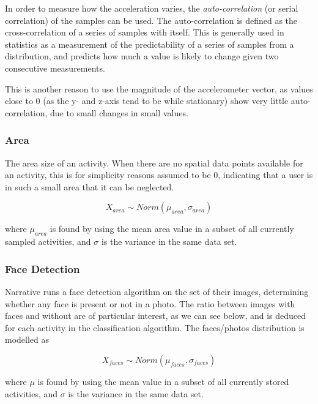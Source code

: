 In order to measure how the acceleration varies, the 
\emph{auto-correlation} (or serial correlation) of the samples can be used. The 
auto-correlation is defined as the cross-correlation of a series of 
samples with itself. This is generally used in statistics as a measurement of 
the predictability of a series of samples from a distribution, and predicts 
how much a value is likely to change given two consecutive measurements. 

This is another reason to use the magnitude of the accelerometer vector, as
values close to 0 (as the y- and z-axis tend to be while stationary) show 
very little auto-correlation, due to small changes in small values.

\subsubsection{Area}
The area size of an activity. When there are no spatial data points
available for an activity, this is for simplicity reasons assumed to 
be $0$, indicating that a user is in such a small area that it can be
neglected. 
\begin{definition}
\label{definition:area-variable}
$$
    X_{area} \sim Norm(\mu_{area}, \sigma_{area})
$$
\end{definition}
where $\mu_{area}$ is found by using the mean area value in a subset of 
all currently sampled activities, and $\sigma$ is the variance in the same 
data set.  

\subsubsection{Face Detection}
Narrative runs a face detection algorithm on the set of their images, 
determining whether any face is present or not in a photo. The ratio 
between images with faces and without are of particular interest, as we can 
see below, and is deduced for each activity in the classification algorithm. 
The faces/photos distribution is modelled as 
\begin{definition}
\label{definition:faces-variable}
$$
    X_{faces} \sim Norm(\mu_{faces}, \sigma_{faces})
$$
\end{definition}
where $\mu$ is found by using the mean value in a subset of all currently 
stored activities, and $\sigma$ is the variance in the same data set.  

